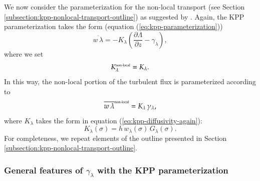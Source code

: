 We now consider the parameterization for the non-local transport (see
Section \ref{subsection:kpp-nonlocal-transport-outline}) as suggested
by \cite{LargeKPP}.  Again, the KPP parameterization takes the form
(equation (\ref{eq:kpp-parameterization}))
\begin{equation}
  \overline{w \, \lambda} = -K_{\lambda} \left( \frac{\partial \Lambda}{\partial z} - \gamma_{\lambda} \right),
\label{eq:kpp-parameterization-yet-again}
\end{equation}
where we set 
\begin{equation}
K^{\mbox{\tiny non-local}}_{\lambda} = K_{\lambda}.
\end{equation}
In this way, the non-local portion of the turbulent flux is
parameterized according to
\begin{equation}
 \overline{w \, \lambda}^{\mbox{\tiny non-local}} = K_{\lambda}  \, \gamma_{\lambda},  
\end{equation}
where $K_{\lambda}$ takes the form in equation
(\ref{eq:kpp-diffusivity-again}): 
\begin{equation}
 K_{\lambda}(\sigma) = h \, w_{\lambda}(\sigma) \, G_{\lambda}(\sigma).
\label{eq:kpp-diffusivity-yet-again}
\end{equation}
For completeness, we repeat elements of the outline presented in
Section \ref{subsection:kpp-nonlocal-transport-outline}.


\subsubsection{General features of $\gamma_{\lambda}$ with the KPP parameterization}

